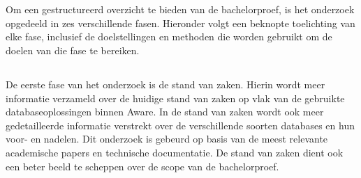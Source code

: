 
\chapter{}%
\label{ch:methodologie}


Om een gestructureerd overzicht te bieden van de bachelorproef, is het onderzoek opgedeeld in zes verschillende fasen. Hieronder volgt een beknopte toelichting van elke fase, inclusief de doelstellingen en methoden die worden gebruikt om de doelen van die fase te bereiken.

\section{}%
\label{sec:literatuurstudie-methodologie}

De eerste fase van het onderzoek is de stand van zaken. Hierin wordt meer informatie verzameld over de huidige stand van zaken op vlak van de gebruikte databaseoplossingen binnen Aware. In de stand van zaken wordt ook meer gedetailleerde informatie verstrekt over de verschillende soorten databases en hun voor- en nadelen. Dit onderzoek is gebeurd op basis van de meest relevante academische papers en technische documentatie. De stand van zaken dient ook een beter beeld te scheppen over de scope van de bachelorproef.

